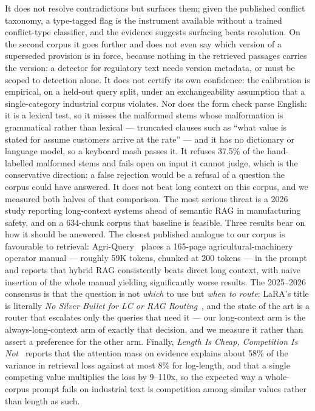 \documentclass[preprint,3p,times]{elsarticle}
\begin{document}
It does not resolve contradictions but surfaces them; given the published
conflict taxonomy, a type-tagged flag is the instrument available without a
trained conflict-type classifier, and the evidence suggests surfacing beats
resolution. On the second corpus it goes further and does not even say which
version of a superseded provision is in force, because nothing in the
retrieved passages carries the version: a detector for regulatory text needs
version metadata, or must be scoped to detection alone. It does not certify
its own confidence: the calibration is
empirical, on a held-out query split, under an exchangeability assumption that
a single-category industrial corpus violates. Nor does the form check parse
English: it is a lexical test, so it misses the malformed stems whose
malformation is grammatical rather than lexical --- truncated clauses such as
``what value is stated for assume customers arrive at the rate'' --- and it has
no dictionary or language model, so a keyboard mash passes it. It refuses
37.5\% of the hand-labelled malformed stems and fails open
on input it cannot judge, which is the conservative direction: a false
rejection would be a refusal of a question the corpus could have answered.
It does not beat long context on this corpus, and we measured both halves of that comparison. The most
serious threat is a 2026 study reporting long-context systems ahead of semantic
RAG in manufacturing safety, and on a 634-chunk corpus that baseline is
feasible. Three results bear on how it should be answered. The closest
published analogue to our corpus is favourable to retrieval:
Agri-Query~\cite{chen2026agriquery} places a 165-page agricultural-machinery
operator manual --- roughly 59K tokens, chunked at 200 tokens --- in the prompt
and reports that hybrid RAG consistently beats direct long context, with naive
insertion of the whole manual yielding significantly worse results. The
2025--2026 consensus is that the question is not \emph{which} to use but
\emph{when to route}: LaRA's title is literally \emph{No Silver Bullet for LC
or RAG Routing}~\cite{lu2025lara}, and the state of the art is a router that
escalates only the queries that need it --- our long-context arm is the
always-long-context arm of exactly that decision, and we measure it rather
than assert a preference for the other arm. Finally, \emph{Length Is Cheap,
Competition Is Not}~\cite{liu2026lengthcheap} reports that the attention mass
on evidence explains about 58\% of the variance in retrieval loss against at
most 8\% for log-length, and that a single competing value multiplies the loss
by 9--110x, so the expected way a whole-corpus prompt fails on industrial text
is competition among similar values rather than length as such.
\end{document}
